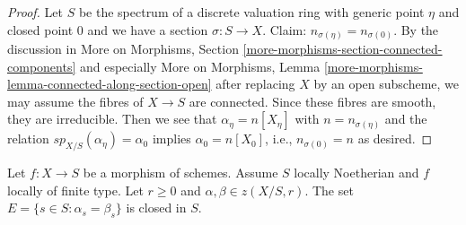 \begin{proof}
\medskip\noindent
Let $S$ be the spectrum of a discrete valuation ring with
generic point $\eta$ and closed point $0$ and we have a section
$\sigma : S  \to X$. Claim: $n_{\sigma(\eta)} = n_{\sigma(0)}$.
By the discussion in More on Morphisms, Section
\ref{more-morphisms-section-connected-components} and especially
More on Morphisms, Lemma \ref{more-morphisms-lemma-connected-along-section-open}
after replacing $X$ by an open subscheme, we may assume the
fibres of $X \to S$ are connected. Since these fibres
are smooth, they are irreducible. Then we see that $\alpha_\eta = n[X_\eta]$
with $n = n_{\sigma(\eta)}$ and the relation $sp_{X/S}(\alpha_\eta) = \alpha_0$
implies $\alpha_0 = n[X_0]$, i.e., $n_{\sigma(0)} = n$ as desired.
\end{proof}

\begin{lemma}
\label{lemma-relative-cycles-equal}
Let $f : X \to S$ be a morphism of schemes. Assume $S$ locally Noetherian
and $f$ locally of finite type. Let $r \geq 0$ and
$\alpha, \beta \in z(X/S, r)$. The set $E = \{s \in S : \alpha_s = \beta_s\}$
is closed in $S$.
\end{lemma}

